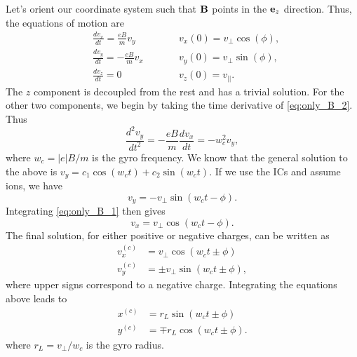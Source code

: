 \documentclass[oneside,a4paper,11pt]{report}
\begin{document}
\label{sec:only_B_field}
Let's orient our coordinate system such that $\mathbf{B}$ points in the $\mathbf{e}_z$ direction. Thus, the equations of motion are
\begin{subequations}
\begin{alignat}{2}
    &\frac{d v_x}{dt} = \frac{eB}{m} v_y  \qquad && v_x(0) = v_\perp \cos(\phi), \label{eq:only_B_1} \\
    &\frac{d v_y}{dt} = -\frac{eB}{m} v_x  \qquad && v_y(0) = v_\perp \sin(\phi), \label{eq:only_B_2} \\
    &\frac{d v_z}{dt} = 0  \qquad && v_z(0) = v_{||}. \label{eq:only_B_3}
\end{alignat}
\end{subequations}
The $z$ component is decoupled from the rest and has a trivial solution. For the other two components, we begin by taking the time derivative of \cref{eq:only_B_2}. Thus
\begin{equation}
    \frac{d^2 v_y}{dt^2} = -\frac{eB}{m} \frac{d v_x}{dt} = -w_c^2 v_y,
\end{equation}
where $w_c = |e|B/m$ is the gyro frequency. We know that the general solution to the above is $v_y = c_1 \cos(w_c t) + c_2 \sin(w_c t)$. If we use the ICs and assume ions, we have
\begin{equation}
\label{eq:vel_gyro_y}
    v_y = -v_\perp \sin(w_ct - \phi).
\end{equation}
Integrating \cref{eq:only_B_1} then gives
\begin{equation}
\label{eq:vel_gyro_x}
    v_x = v_\perp \cos(w_c t - \phi).
\end{equation}
The final solution, for either positive or negative charges, can be written as
\begin{align}
\label{eq:vel_gyro}
    v^{(c)}_x &= v_\perp \cos(w_c t \pm \phi) \nonumber \\
    v^{(c)}_y &= \pm v_\perp \sin(w_c t \pm \phi),
\end{align}
where upper signs correspond to a negative charge. Integrating the equations above leads to
\begin{align}
\label{eq:pos_gyro}
    x^{(c)} &= r_L \sin(w_c t \pm \phi) \nonumber \\
    y^{(c)} &= \mp r_L \cos(w_c t \pm \phi).
\end{align}
where $r_L = v_\perp/w_c$ is the gyro radius.

\end{document}
